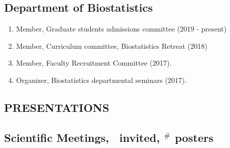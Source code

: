 \documentclass[10pt]{article}
\newcommand{\mydot}[1]{\begin{enumerate}[label=$\circ$,leftmargin=\parindent]\setlength{\itemsep}{#1}}
\newcommand{\ee}{\end{enumerate}}
\begin{document}
\smallskip

\subsection*{Department of Biostatistics}

\mydot{-0.1em}

\item Member, Graduate students admissions committee (2019 - present)
\item Member, Curriculum committee, Biostatistics Retreat (2018)
\item Member, Faculty Recruitment Committee (2017).
\item Organizer, Biostatistics departmental seminars (2017).

\ee


\subsection*{PRESENTATIONS}

\smallskip

\subsection*{Scientific Meetings,  \ \small* invited, $^\#$ posters}
\end{document}
